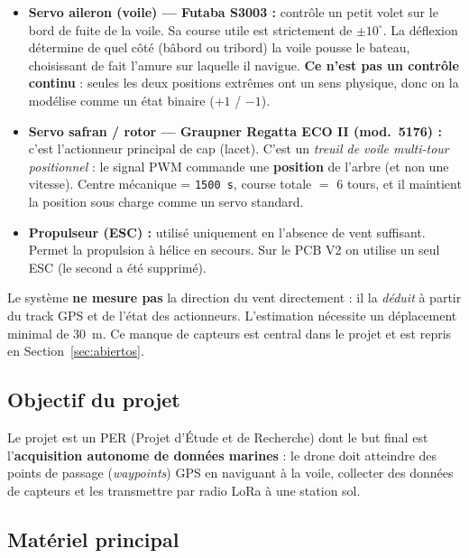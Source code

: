 \documentclass[12pt,a4paper]{article}
\newcommand{\us}[1]{\texttt{#1\,\textmu s}}
\begin{document}
\begin{itemize}
  \item \textbf{Servo aileron (voile) --- Futaba S3003 :} contr\^ole un petit volet
    sur le bord de fuite de la voile. Sa course utile est strictement de
    $\pm10^{\circ}$. La d\'eflexion d\'etermine de quel c\^ot\'e (b\^abord ou tribord)
    la voile pousse le bateau, choisissant de fait l'amure sur laquelle il navigue.
    \textbf{Ce n'est pas un contr\^ole continu} : seules les deux positions extr\^emes
    ont un sens physique, donc on la mod\'elise comme un \'etat binaire ($+1$ / $-1$).

  \item \textbf{Servo safran / rotor --- Graupner Regatta ECO II (mod.\ 5176) :}
    c'est l'actionneur principal de cap (lacet). C'est un \emph{treuil de voile
    multi-tour positionnel} : le signal PWM commande une \textbf{position} de l'arbre
    (et non une vitesse). Centre m\'ecanique = \us{1500}, course totale $=$ 6 tours,
    et il maintient la position sous charge comme un servo standard.

  \item \textbf{Propulseur (ESC) :} utilis\'e uniquement en l'absence de vent
    suffisant. Permet la propulsion à h\'elice en secours. Sur le PCB V2 on utilise un
    seul ESC (le second a \'et\'e supprim\'e).
\end{itemize}

\begin{infobox}
  Le syst\`eme \textbf{ne mesure pas} la direction du vent directement : il la
  \emph{d\'eduit} à partir du track GPS et de l'\'etat des actionneurs. L'estimation
  n\'ecessite un d\'eplacement minimal de 30~m. Ce manque de capteurs est central
  dans le projet et est repris en Section~\ref{sec:abiertos}.
\end{infobox}

\subsection{Objectif du projet}

Le projet est un PER (Projet d'\'Etude et de Recherche) dont le but final est
l'\textbf{acquisition autonome de donn\'ees marines} : le drone doit atteindre des
points de passage (\emph{waypoints}) GPS en naviguant à la voile, collecter des
donn\'ees de capteurs et les transmettre par radio LoRa à une station sol.

\subsection{Mat\'eriel principal}
\end{document}
